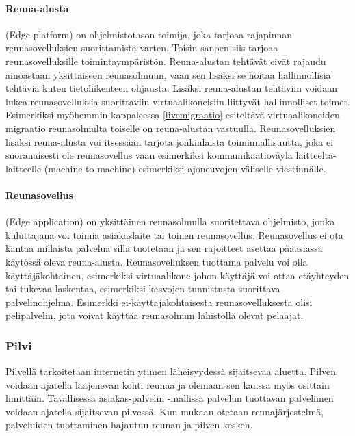 \paragraph{Reuna-alusta}
(Edge platform) on ohjelmistotason toimija, joka tarjoaa rajapinnan reunasovelluksien suorittamista varten. Toisin sanoen siis tarjoaa reunasovelluksille toimintaympäristön.
Reuna-alustan tehtävät eivät rajaudu ainoastaan yksittäiseen reunasolmuun, vaan sen lisäksi se hoitaa hallinnollisia tehtäviä kuten tietoliikenteen ohjausta. Lisäksi reuna-alustan tehtäviin voidaan lukea reunasovelluksia suorittaviin virtuaalikoneisiin liittyvät hallinnolliset toimet. Esimerkiksi myöhemmin kappaleessa \ref{livemigraatio} esiteltävä virtuaalikoneiden migraatio reunasolmulta toiselle on reuna-alustan vastuulla.
Reunasovelluksien lisäksi reuna-alusta voi itsessään tarjota jonkinlaista toiminnallisuutta, joka ei suoranaisesti ole reunasovellus vaan esimerkiksi kommunikaatioväylä laitteelta-laitteelle (machine-to-machine) esimerkiksi ajoneuvojen väliselle viestinnälle. 

\paragraph{Reunasovellus}
(Edge application) on yksittäinen reunasolmulla suoritettava ohjelmisto, jonka kuluttajana voi toimia asiakaslaite tai toinen reunasovellus. Reunasovellus ei ota kantaa millaista palvelua sillä tuotetaan ja sen rajoitteet asettaa pääasiassa käytössä oleva reuna-alusta. Reunasovelluksen tuottama palvelu voi olla käyttäjäkohtainen, esimerkiksi virtuaalikone johon käyttäjä voi ottaa etäyhteyden tai tukevaa laskentaa, esimerkiksi kasvojen tunnistusta suorittava palvelinohjelma. Esimerkki ei-käyttäjäkohtaisesta reunasovelluksesta olisi pelipalvelin, jota voivat käyttää reunasolmun lähistöllä olevat pelaajat. 

\subsubsection{Pilvi}
Pilvellä tarkoitetaan internetin ytimen läheisyydessä sijaitsevaa aluetta.
Pilven voidaan ajatella laajenevan kohti reunaa ja olemaan sen kanssa myös osittain limittäin.
Tavallisessa asiakas-palvelin -mallissa palvelun tuottavan palvelimen voidaan ajatella sijaitsevan pilvessä. Kun mukaan otetaan reunajärjestelmä, palveluiden tuottaminen hajautuu reunan ja pilven kesken.



